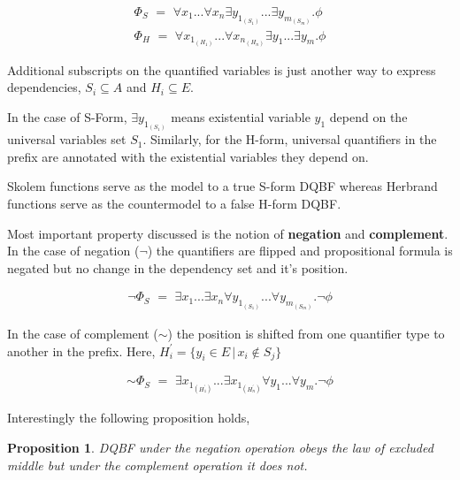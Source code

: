 \documentclass[runningheads]{llncs}
\newtheorem{prop}{Proposition}
\begin{document}
\begin{align}
\Phi_{S} \,\, = \,\, \forall x_{1}... \forall x_{n} \exists y_{1_{(S_{1})}}...\exists y_{m_{(S_{m})}} . \phi \label{eq1}\\
\Phi_{H}  \,\, = \,\, \forall x_{1_{(H_{1})}}... \forall x_{n_{(H_{n})}} \exists y_{1}...\exists y_{m} . \phi \label{eq2}
\end{align}

Additional subscripts on the quantified variables is just another way to express dependencies, $S_{i} \subseteq A$ and $H_{i} \subseteq E$.

In the case of S-Form, $\exists y_{1_{(S_{1})}}$ means  existential variable $y_{1}$ depend on the universal variables set $S_{1}$. 
%
Similarly, for the H-form, universal quantifiers in the prefix are annotated with the existential variables they depend on. 

Skolem functions serve as the model to a true S-form DQBF whereas Herbrand functions serve as the countermodel to a false H-form DQBF.

Most important property discussed is the notion of \textbf{negation} and \textbf{complement}.
%
In the case of negation ($\neg$) the quantifiers are flipped and propositional formula is negated but no change in the dependency set and it's position.

\begin{align}
\neg \Phi_{S} \,\, =   \,\, \exists x_{1}... \exists x_{n} \forall y_{1_{(S_{1})}}...\forall y_{m_{(S_{m})}} . \neg \phi \label{eq3}
\end{align}

In the case of complement ($\sim$) the position is shifted from one quantifier type to another in the prefix. Here, $H^{\prime}_{i} = \{ y_{i} \in E \, | \, x_{i} \notin S_{j} \}$

\begin{align}
\sim \Phi_{S} \,\, =   \,\, \exists x_{1_{(H^{\prime}_1)}}... \exists x_{1_{(H^{\prime}_n)}} \forall y_{1}...\forall y_{m} . \neg \phi \label{eq4}
\end{align}

Interestingly the following proposition holds, 
\begin{prop}
	DQBF under the negation operation obeys the law of excluded middle but under the complement operation it does not.
\end{prop} 
\end{document}
